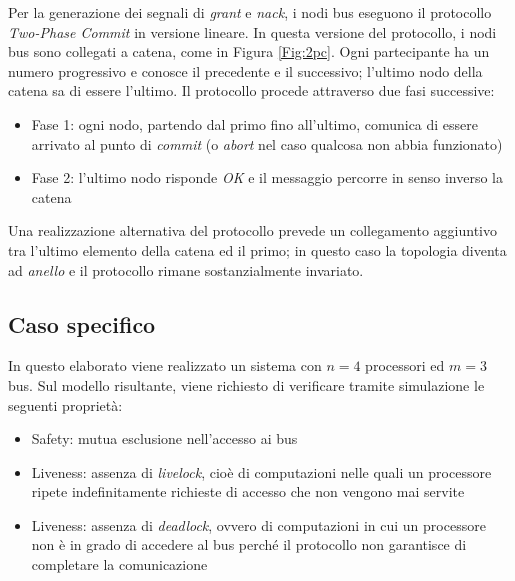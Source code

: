 Per la generazione dei segnali di \textit{grant} e \textit{nack}, i nodi bus eseguono il protocollo \textit{Two-Phase Commit} in versione lineare. In questa versione del protocollo, i nodi bus sono collegati a catena, come in Figura \ref{Fig:2pc}. Ogni partecipante ha un numero progressivo e conosce il precedente e il successivo; l'ultimo nodo della catena sa di essere l'ultimo. Il protocollo procede attraverso due fasi successive:
\begin{itemize}
\item Fase 1: ogni nodo, partendo dal primo fino all'ultimo, comunica di essere arrivato al punto di \textit{commit} (o \textit{abort} nel caso qualcosa non abbia funzionato)
\item Fase 2: l'ultimo nodo risponde \textit{OK} e il messaggio percorre in senso inverso la catena
\end{itemize}

Una realizzazione alternativa del protocollo prevede un collegamento aggiuntivo tra l'ultimo elemento della catena ed il primo; in questo caso la topologia diventa ad \textit{anello} e il protocollo rimane sostanzialmente invariato.

\subsection{Caso specifico}
\label{Sec:prop}
In questo elaborato viene realizzato un sistema con $n=4$ processori ed $m=3$ bus. Sul modello risultante, viene richiesto di verificare tramite simulazione le seguenti proprietà:
\begin{itemize}
\item Safety: mutua esclusione nell'accesso ai bus
\item Liveness: assenza di \textit{livelock}, cioè di computazioni nelle quali un processore ripete indefinitamente richieste di accesso che non vengono mai servite
\item Liveness: assenza di \textit{deadlock}, ovvero di computazioni in cui un processore non è in grado di accedere al bus perché il protocollo non garantisce di completare la comunicazione
\end{itemize}
